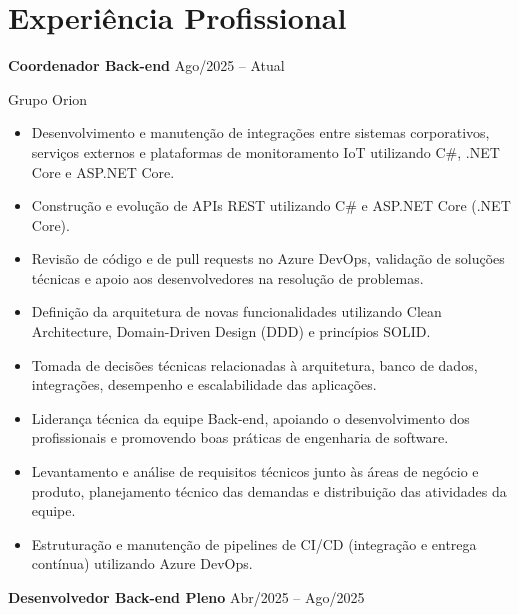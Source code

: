 \documentclass[11pt,a4paper]{article}
\begin{document}
\section{Experiência Profissional}

\textbf{Coordenador Back-end}
\hfill Ago/2025 -- Atual

Grupo Orion

\begin{itemize}[leftmargin=*,noitemsep,topsep=2pt]

\item Desenvolvimento e manutenção de integrações entre sistemas corporativos, serviços externos e plataformas de monitoramento IoT utilizando C\#, .NET Core e ASP.NET Core.

\item Construção e evolução de APIs REST utilizando C\# e ASP.NET Core (.NET Core).

\item Revisão de código e de pull requests no Azure DevOps, validação de soluções técnicas e apoio aos desenvolvedores na resolução de problemas.

\item Definição da arquitetura de novas funcionalidades utilizando Clean Architecture, Domain-Driven Design (DDD) e princípios SOLID.

\item Tomada de decisões técnicas relacionadas à arquitetura, banco de dados, integrações, desempenho e escalabilidade das aplicações.

\item Liderança técnica da equipe Back-end, apoiando o desenvolvimento dos profissionais e promovendo boas práticas de engenharia de software.

\item Levantamento e análise de requisitos técnicos junto às áreas de negócio e produto, planejamento técnico das demandas e distribuição das atividades da equipe.

\item Estruturação e manutenção de pipelines de CI/CD (integração e entrega contínua) utilizando Azure DevOps.

\end{itemize}

\vspace{0.2cm}

\textbf{Desenvolvedor Back-end Pleno}
\hfill Abr/2025 -- Ago/2025
\end{document}
